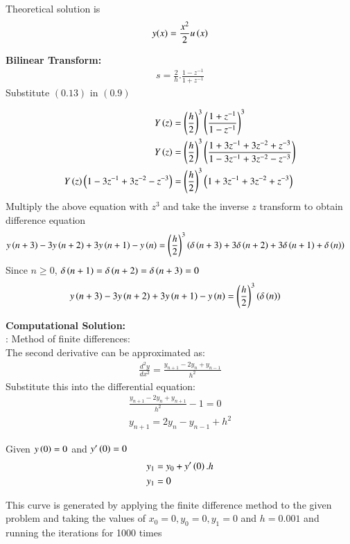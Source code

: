 \documentclass[journal]{IEEEtran}
\begin{document}
Theoretical solution is 
\begin{align}
    y(x) = \frac{x^2}{2} u\left(x\right)
\end{align}

\textbf{Bilinear Transform:}
\begin{align}
    s=\frac{2}{h}.\frac{1-z^{-1}}{1+z^{-1}}
\end{align}
Substitute $(0.13)$ in $(0.9)$

\begin{align}
    Y\left(z\right)&=\left(\frac{h}{2}\right)^3 \left(\frac{1+z^{-1}}{1-z^{-1}}\right)^3\\
    Y\left(z\right)&=\left(\frac{h}{2}\right)^3 \left(\frac{1+3z^{-1}+3z^{-2}+z^{-3}}{1-3z^{-1}+3z^{-2}-z^{-3}}\right)\\
    Y\left(z\right)\left(1-3z^{-1}+3z^{-2}-z^{-3}\right)&=\left(\frac{h}{2}\right)^3 \left(1+3z^{-1}+3z^{-2}+z^{-3}\right)
\end{align}
Multiply the above equation with $z^3$ and take the inverse $z$ transform to obtain difference equation
\begin{align}
    y\left(n+3\right)-3y\left(n+2\right)+3y\left(n+1\right)-y\left(n\right)&=\left(\frac{h}{2}\right)^3\left(\delta\left(n+3\right)+3\delta\left(n+2\right)+3\delta\left(n+1\right)+\delta\left(n\right)\right)   
\end{align}
Since $n\geq 0$, $\delta\left(n+1\right)=\delta\left(n+2\right)=\delta\left(n+3\right)=0$\\
\begin{align}
    y\left(n+3\right)-3y\left(n+2\right)+3y\left(n+1\right)-y\left(n\right)&=\left(\frac{h}{2}\right)^3 \left(\delta\left(n\right)\right)
\end{align}

\textbf{Computational Solution:}\\:
Method of finite differences:\\
The second derivative can be approximated as:
\begin{align}
    \frac{d^2y}{dx^2}=\frac{y_{n+1}-2y_n+y_{n-1}}{h^2}
\end{align}
Substitute this into the differential equation:
\begin{align}
    \frac{y_{n+1}-2y_n+y_{n+1}}{h^2}-1=0\\
    y_{n+1}=2y_{n}-y_{n-1}+h^2
\end{align}

Given $y\left(0\right)=0$ and $y^{\prime}\left(0\right)=0$
\begin{align}
    y_{1}&=y_{0}+y^{\prime}\left(0\right).h\\
    y_1&=0
\end{align}

This curve is generated by applying the finite difference method to the given problem and taking the values of $x_0=0,y_0=0,y_1=0$ and $h=0.001$ and running the iterations for 1000 times
\end{document}
